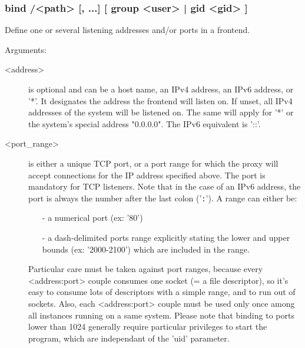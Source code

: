 \subsubsection*{bind /<path> [, ...] [ group <user> | gid <gid> ]}

  Define one or several listening addresses and/or ports in a frontend.
    
                                
  Arguments:
  \begin{description}
  \item[<address>]     is optional and can be a host name, an IPv4 address, an IPv6
                  address, or '*'. It designates the address the frontend will
                  listen on. If unset, all IPv4 addresses of the system will be
                  listened on. The same will apply for '*' or the system's
                  special address "0.0.0.0". The IPv6 equivalent is '::'.

  \item[<port\_range>]  is either a unique TCP port, or a port range for which the
                  proxy will accept connections for the IP address specified
                  above. The port is mandatory for TCP listeners. Note that in
                  the case of an IPv6 address, the port is always the number
                  after the last colon ('\verb|:|'). A range can either be:
                  
                  \begin{itemize}
                  \item[-] a numerical port (ex: '80')
                  \item[-] a dash-delimited ports range explicitly stating the lower
                     and upper bounds (ex: '2000-2100') which are included in
                     the range.
                  \end{itemize}

                  Particular care must be taken against port ranges, because
                  every <address:port> couple consumes one socket (= a file
                  descriptor), so it's easy to consume lots of descriptors
                  with a simple range, and to run out of sockets. Also, each
                  <address:port> couple must be used only once among all
                  instances running on a same system. Please note that binding
                  to ports lower than 1024 generally require particular
                  privileges to start the program, which are independant of
                  the 'uid' parameter.


\end{description}
